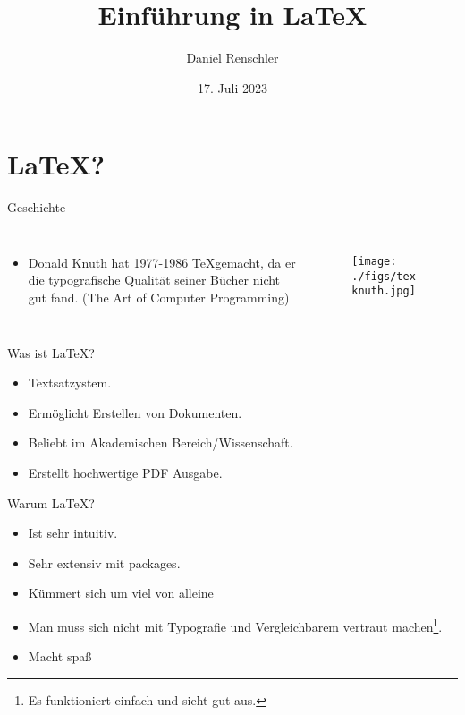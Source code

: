 \documentclass{beamer}
\title{Einf\"uhrung in \LaTeX}
\author{Daniel Renschler}
\date{17. Juli 2023}
\begin{document}
\begin{frame}
    \titlepage 
\end{frame}


\begin{frame}
    \tableofcontents
\end{frame}


\section{\LaTeX?}
\begin{frame}{Geschichte}
    \begin{columns}


    \begin{itemize}
        \item Donald Knuth hat 1977-1986 \TeX gemacht, da er die typografische Qualit\"at seiner B\"ucher nicht gut fand. (The Art of Computer Programming)

    \end{itemize}
        
        \hfill
        \begin{figure}[htpb]
            \centering
            \texttt{[image: ./figs/tex-knuth.jpg]}
        \end{figure}
    \end{columns}
\end{frame}

\begin{frame}{Was ist \LaTeX?}
    \begin{itemize}
        \item Textsatzystem.
        \item Erm\"oglicht Erstellen von Dokumenten.
        \item Beliebt im Akademischen Bereich/Wissenschaft.
        \item Erstellt hochwertige PDF Ausgabe.
    \end{itemize}
    
\end{frame}



\begin{frame}{Warum \LaTeX?}
    \begin{itemize}
        \item Ist sehr intuitiv.
        \item Sehr extensiv mit packages.
        \item K\"ummert sich um viel von alleine
        \item Man muss sich nicht mit Typografie und Vergleichbarem vertraut machen\footnote{Es funktioniert einfach und sieht gut aus.}.
        \item Macht spa\ss
    \end{itemize}
\end{frame}
\end{document}
